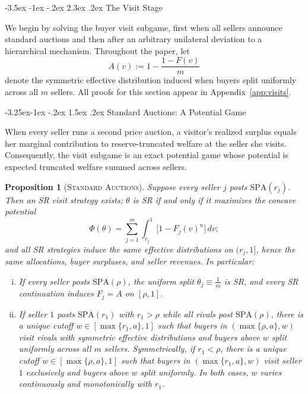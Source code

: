 \documentclass[12pt]{article}
\makeatletter
\theoremstyle{mystyle}
\newtheorem{proposition}{Proposition}
\theoremstyle{mystyle2}
\newcommand{\mmpfont}{\scshape}
\renewcommand\section{\@startsection {section}{1}{\z@}%
                                   {-3.5ex \@plus -1ex \@minus -.2ex}%
                                   {2.3ex \@plus .2ex}%
                                   {\normalfont\large\mmpfont}}
\renewcommand\subsection{\@startsection{subsection}{2}{\z@}%
                                     {-3.25ex\@plus -1ex \@minus -.2ex}%
                                     {1.5ex \@plus .2ex}%
                                     {\normalfont\normalsize\mmpfont}}
\newcommand{\SPA}{\mathrm{SPA}}
\newcommand{\1}{\mathbf{1}}
\makeatother
\begin{document}
\section{The Visit Stage} \label{sec:visits}

We begin by solving the buyer visit subgame, first when all sellers announce standard auctions and then after an arbitrary unilateral deviation to a hierarchical mechanism. Throughout the paper, let
\[
A(v) := 1 - \frac{1-F(v)}{m}
\]
denote the symmetric effective distribution induced when buyers split uniformly across all $m$ sellers. All proofs for this section appear in Appendix~\ref{app:visits}.

\subsection{Standard Auctions: A Potential Game}

When every seller runs a second price auction, a visitor's realized surplus equals her marginal contribution to reserve-truncated welfare at the seller she visits. Consequently, the visit subgame is an exact potential game \citep{monderer1996} whose potential is expected truncated welfare summed across sellers.

\begin{proposition}[\textsc{Standard Auctions}]\label{prop:pot}
Suppose every seller $j$ posts $\SPA(r_j)$. Then an SR visit strategy exists; $\theta$ is SR if and only if it maximizes the concave potential
\begin{equation}\label{eq:pot}
\Phi(\theta) = \sum_{j=1}^m \int_{r_j}^1 \bigl[1 - F_j(v)^n\bigr]\,dv;
\end{equation}
and all SR strategies induce the same effective distributions on $(r_j,1]$, hence the same allocations, buyer surpluses, and seller revenues. In particular:
\begin{enumerate}[(i)]
\item If every seller posts $\SPA(\rho)$, the uniform split $\theta_j\equiv\frac{1}{m}$ is SR, and every SR continuation induces $F_j=A$ on $[\rho,1]$.
\item If seller $1$ posts $\SPA(r_1)$ with $r_1>\rho$ while all rivals post $\SPA(\rho)$, there is a unique cutoff $w\in[\max\{r_1,a\},1]$ such that buyers in $(\max\{\rho,a\},w)$ visit rivals with symmetric effective distributions and buyers above $w$ split uniformly across all $m$ sellers. Symmetrically, if $r_1<\rho$, there is a unique cutoff $w\in[\max\{\rho,a\},1]$ such that buyers in $(\max\{r_1,a\},w)$ visit seller $1$ exclusively and buyers above $w$ split uniformly. In both cases, $w$ varies continuously and monotonically with $r_1$.
\end{enumerate}
\end{proposition}
\end{document}
